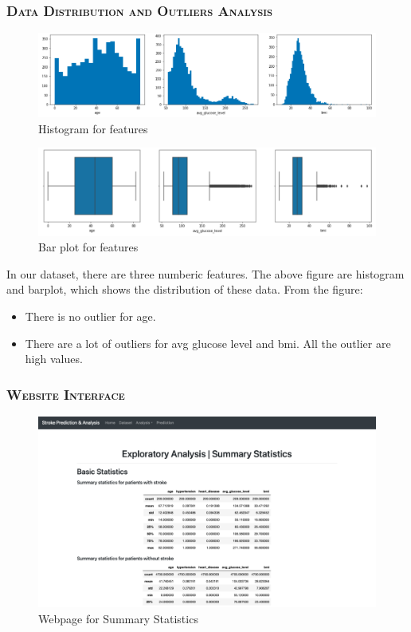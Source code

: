 \documentclass[a4paper,12pt]{article}
\begin{document}
\subsubsection{\textsc{Data Distribution and Outliers Analysis}}
\begin{figure}[h] 
    \centering
    \includegraphics[width=.7\textwidth]{stat_p4} 
    \caption{Histogram for features} 
\end{figure}
\begin{figure}[h] 
    \centering
    \includegraphics[width=.7\textwidth]{stat_p3} 
    \caption{Bar plot for features} 
\end{figure}
In our dataset, there are three numberic features. The above figure are histogram and barplot, which shows the distribution of these data. From the figure:
\begin{itemize}
\item There is no outlier for age.
\item There are a lot of outliers for avg glucose level and bmi. All the outlier are high values.
\end{itemize}

\newpage
\subsubsection{\textsc{Website Interface}}
\begin{figure}[h] 
    \centering
    \includegraphics[width=1\textwidth]{ss} 
    \caption{Webpage for Summary Statistics} 
\end{figure}
\end{document}
